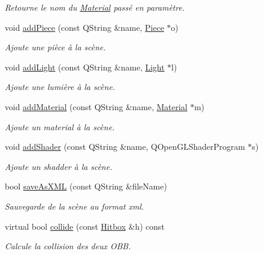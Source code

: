 \begin{DoxyCompactItemize}
\begin{DoxyCompactList}\small\item\em Retourne le nom du \hyperlink{class_material}{Material} passé en paramètre. \end{DoxyCompactList}\item 
void \hyperlink{class_scene_a6c40a38ef472e73ddee697f813b8e587}{add\+Piece} (const Q\+String \&name, \hyperlink{class_piece}{Piece} $\ast$o)
\begin{DoxyCompactList}\small\item\em Ajoute une pièce à la scène. \end{DoxyCompactList}\item 
void \hyperlink{class_scene_aedf1b6729e0feda58666662c349ffed1}{add\+Light} (const Q\+String \&name, \hyperlink{class_light}{Light} $\ast$l)
\begin{DoxyCompactList}\small\item\em Ajoute une lumière à la scène. \end{DoxyCompactList}\item 
void \hyperlink{class_scene_a68761479fea650973d31e2d9565f8aca}{add\+Material} (const Q\+String \&name, \hyperlink{class_material}{Material} $\ast$m)
\begin{DoxyCompactList}\small\item\em Ajoute un material à la scène. \end{DoxyCompactList}\item 
void \hyperlink{class_scene_ad15253a331423b1e3c3fb2484b10509c}{add\+Shader} (const Q\+String \&name, Q\+Open\+G\+L\+Shader\+Program $\ast$s)
\begin{DoxyCompactList}\small\item\em Ajoute un shadder à la scène. \end{DoxyCompactList}\item 
bool \hyperlink{class_scene_a696a59602fa780cd7904df5c50b94eae}{save\+As\+X\+M\+L} (const Q\+String \&file\+Name)
\begin{DoxyCompactList}\small\item\em Sauvegarde de la scène au format xml. \end{DoxyCompactList}\item 
virtual bool \hyperlink{class_scene_a55a738d6643c4d9964caf84a0d361dbe}{collide} (const \hyperlink{class_hitbox}{Hitbox} \&h) const 
\begin{DoxyCompactList}\small\item\em Calcule la collision des deux O\+B\+B. \end{DoxyCompactList}\end{DoxyCompactItemize}
